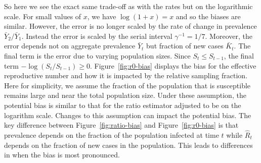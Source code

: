 \documentclass[aoas]{amsart}
\begin{document}
So here we see the exact same trade-off as with the rates but on the logarithmic scale.  For small values of $x$, we have $\log(1+x) = x$ and so the biases are similar.  However, the error is no longer scaled by the rate of change in prevalence $\bar Y_2/\bar Y_1$. Instead the error is scaled by the serial interval $\gamma^{-1} = 1/7$.  Moreover, the error depends not on aggregate prevalence $\bar Y_t$ but fraction of new cases $\bar K_t$. The final term is the error due to varying population sizes.  Since $S_t \leq S_{t-1}$, the final term $- \log (S_t/S_{t-1}) \geq 0$. Figure~\ref{fig:r0-bias} displays the bias for the effective reproductive number and how it is impacted by the relative sampling fraction.  Here for simplicity, we assume the fraction of the population that is susceptible remains large and near the total population size.  Under these assumption, the potential bias is similar to that for the ratio estimator adjusted to be on the logarithm scale.  Changes to this assumption can impact the potential bias.  The key difference between Figure~\ref{fig:ratio-bias} and Figure~\ref{fig:r0-bias} is that prevalence depends on the fraction of the population infected at time $t$ while $\hat R_t$ depends on the fraction of new cases in the population. This leads to differences in when the bias is most pronounced.
\end{document}

